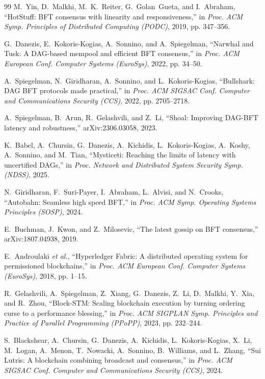 \documentclass[journal]{IEEEtran}
\theoremstyle{remark}
\begin{document}
\begin{thebibliography}{99}
 M.~Yin, D.~Malkhi, M.~K.~Reiter, G.~Golan~Gueta, and I.~Abraham,
``HotStuff: BFT consensus with linearity and responsiveness,'' in \emph{Proc. ACM Symp.
Principles of Distributed Computing (PODC)}, 2019, pp. 347--356.

 G.~Danezis, E.~Kokoris-Kogias, A.~Sonnino, and A.~Spiegelman, ``Narwhal and
Tusk: A DAG-based mempool and efficient BFT consensus,'' in \emph{Proc. ACM European Conf.
Computer Systems (EuroSys)}, 2022, pp. 34--50.

 A.~Spiegelman, N.~Giridharan, A.~Sonnino, and L.~Kokoris-Kogias,
``Bullshark: DAG BFT protocols made practical,'' in \emph{Proc. ACM SIGSAC Conf. Computer and
Communications Security (CCS)}, 2022, pp. 2705--2718.

 A.~Spiegelman, B.~Arun, R.~Gelashvili, and Z.~Li, ``Shoal: Improving DAG-BFT
latency and robustness,'' arXiv:2306.03058, 2023.

 K.~Babel, A.~Chursin, G.~Danezis, A.~Kichidis, L.~Kokoris-Kogias, A.~Koshy,
A.~Sonnino, and M.~Tian, ``Mysticeti: Reaching the limits of latency with uncertified DAGs,'' in
\emph{Proc. Network and Distributed System Security Symp. (NDSS)}, 2025.

 N.~Giridharan, F.~Suri-Payer, I.~Abraham, L.~Alvisi, and N.~Crooks,
``Autobahn: Seamless high speed BFT,'' in \emph{Proc. ACM Symp. Operating Systems Principles
(SOSP)}, 2024.

 E.~Buchman, J.~Kwon, and Z.~Milosevic, ``The latest gossip on BFT
consensus,'' arXiv:1807.04938, 2019.

 E.~Androulaki \emph{et al.}, ``Hyperledger Fabric: A distributed operating
system for permissioned blockchains,'' in \emph{Proc. ACM European Conf. Computer Systems
(EuroSys)}, 2018, pp. 1--15.

 R.~Gelashvili, A.~Spiegelman, Z.~Xiang, G.~Danezis, Z.~Li, D.~Malkhi, Y.~Xia,
and R.~Zhou, ``Block-STM: Scaling blockchain execution by turning ordering curse to a performance
blessing,'' in \emph{Proc. ACM SIGPLAN Symp. Principles and Practice of Parallel Programming
(PPoPP)}, 2023, pp. 232--244.

 S.~Blackshear, A.~Chursin, G.~Danezis, A.~Kichidis, L.~Kokoris-Kogias, X.~Li,
M.~Logan, A.~Menon, T.~Nowacki, A.~Sonnino, B.~Williams, and L.~Zhang, ``Sui Lutris: A blockchain
combining broadcast and consensus,'' in \emph{Proc. ACM SIGSAC Conf. Computer and Communications
Security (CCS)}, 2024.


\end{thebibliography}
\end{document}
